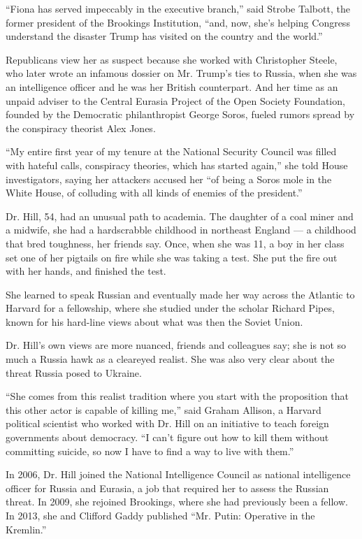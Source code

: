``Fiona has served impeccably in the executive branch,'' said Strobe
Talbott, the former president of the Brookings Institution, ``and, now,
she's helping Congress understand the disaster Trump has visited on the
country and the world.''

Republicans view her as suspect because she worked with Christopher
Steele, who later wrote an infamous dossier on Mr. Trump's ties to
Russia, when she was an intelligence officer and he was her British
counterpart. And her time as an unpaid adviser to the Central Eurasia
Project of the Open Society Foundation, founded by the Democratic
philanthropist George Soros, fueled rumors spread by the conspiracy
theorist Alex Jones.

``My entire first year of my tenure at the National Security Council was
filled with hateful calls, conspiracy theories, which has started
again,'' she told House investigators, saying her attackers accused her
``of being a Soros mole in the White House, of colluding with all kinds
of enemies of the president.''

Dr. Hill, 54, had an unusual path to academia. The daughter of a coal
miner and a midwife, she had a hardscrabble childhood in northeast
England --- a childhood that bred toughness, her friends say. Once, when
she was 11, a boy in her class set one of her pigtails on fire while she
was taking a test. She put the fire out with her hands, and finished the
test.

She learned to speak Russian and eventually made her way across the
Atlantic to Harvard for a fellowship, where she studied under the
scholar Richard Pipes, known for his hard-line views about what was then
the Soviet Union.

Dr. Hill's own views are more nuanced, friends and colleagues say; she
is not so much a Russia hawk as a cleareyed realist. She was also very
clear about the threat Russia posed to Ukraine.

``She comes from this realist tradition where you start with the
proposition that this other actor is capable of killing me,'' said
Graham Allison, a Harvard political scientist who worked with Dr. Hill
on an initiative to teach foreign governments about democracy. ``I can't
figure out how to kill them without committing suicide, so now I have to
find a way to live with them.''

In 2006, Dr. Hill joined the National Intelligence Council as national
intelligence officer for Russia and Eurasia, a job that required her to
assess the Russian threat. In 2009, she rejoined Brookings, where she
had previously been a fellow. In 2013, she and Clifford Gaddy published
``Mr. Putin: Operative in the Kremlin.''


